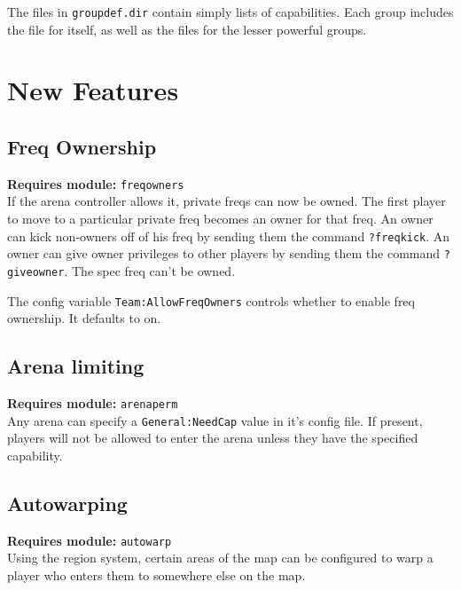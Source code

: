 \documentclass{article}
\newcommand{\requiremod}[1]{\noindent\textbf{Requires module:} \texttt{#1}\\}
\begin{document}
The files in \verb/groupdef.dir/ contain simply lists of capabilities.
Each group includes the file for itself, as well as the files for the
lesser powerful groups.


%
%


\section{New Features}

\subsection{Freq Ownership}

\requiremod{freqowners}
If the arena controller allows it, private freqs can now be owned. The
first player to move to a particular private freq becomes an owner for
that freq. An owner can kick non-owners off of his freq by sending them
the command \verb/?freqkick/. An owner can give owner privileges to
other players by sending them the command \verb/?giveowner/. The spec
freq can't be owned.

The config variable \texttt{Team:AllowFreqOwners} controls whether to
enable freq ownership. It defaults to on.

\subsection{Arena limiting}

\requiremod{arenaperm}
Any arena can specify a \texttt{General:NeedCap} value in it's config
file. If present, players will not be allowed to enter the arena unless
they have the specified capability.


\subsection{Autowarping}

\requiremod{autowarp}
Using the region system, certain areas of the map can be configured to
warp a player who enters them to somewhere else on the map.
\end{document}
